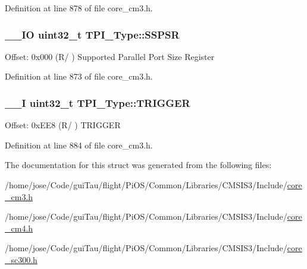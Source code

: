 Definition at line 878 of file core\-\_\-cm3.\-h.

\hypertarget{struct_t_p_i___type_a158e9d784f6ee6398f4bdcb2e4ca0912}{
\subsubsection[{S\-S\-P\-S\-R}]{\setlength{\rightskip}{0pt plus 5cm}\-\_\-\-\_\-\-I\-O {\bf uint32\-\_\-t} T\-P\-I\-\_\-\-Type\-::\-S\-S\-P\-S\-R}}\label{struct_t_p_i___type_a158e9d784f6ee6398f4bdcb2e4ca0912}
Offset\-: 0x000 (R/ ) Supported Parallel Port Size Register 

Definition at line 873 of file core\-\_\-cm3.\-h.

\hypertarget{struct_t_p_i___type_aa4b603c71768dbda553da571eccba1fe}{
\subsubsection[{T\-R\-I\-G\-G\-E\-R}]{\setlength{\rightskip}{0pt plus 5cm}\-\_\-\-\_\-\-I {\bf uint32\-\_\-t} T\-P\-I\-\_\-\-Type\-::\-T\-R\-I\-G\-G\-E\-R}}\label{struct_t_p_i___type_aa4b603c71768dbda553da571eccba1fe}
Offset\-: 0x\-E\-E8 (R/ ) T\-R\-I\-G\-G\-E\-R 

Definition at line 884 of file core\-\_\-cm3.\-h.



The documentation for this struct was generated from the following files\-:\begin{DoxyCompactItemize}
\item 
/home/jose/\-Code/gui\-Tau/flight/\-Pi\-O\-S/\-Common/\-Libraries/\-C\-M\-S\-I\-S3/\-Include/\hyperlink{_common_2_libraries_2_c_m_s_i_s3_2_include_2core__cm3_8h}{core\-\_\-cm3.\-h}\item 
/home/jose/\-Code/gui\-Tau/flight/\-Pi\-O\-S/\-Common/\-Libraries/\-C\-M\-S\-I\-S3/\-Include/\hyperlink{core__cm4_8h}{core\-\_\-cm4.\-h}\item 
/home/jose/\-Code/gui\-Tau/flight/\-Pi\-O\-S/\-Common/\-Libraries/\-C\-M\-S\-I\-S3/\-Include/\hyperlink{core__sc300_8h}{core\-\_\-sc300.\-h}\end{DoxyCompactItemize}
